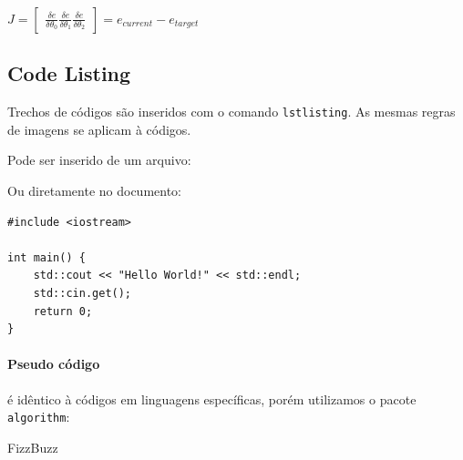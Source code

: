 \documentclass[10pt, a4paper]{article}
\begin{document}
    {\centering \Large \(
        J = \begin{bmatrix}
            \frac{\delta e}{\delta \theta _0}
            \frac{\delta e}{\delta \theta _1}
            \frac{\delta e}{\delta \theta _2}
        \end{bmatrix}
        = e_{current} - e_{target} 
    \)\par}
	
	\subsection{Code Listing}
    Trechos de códigos são inseridos com o comando \texttt{lstlisting}. As mesmas regras de imagens se aplicam à códigos.

    Pode ser inserido de um arquivo:

    

    Ou diretamente no documento:
    
\begin{lstlisting}[caption = Hello World! in c++]
#include <iostream>

int main() {
    std::cout << "Hello World!" << std::endl;
    std::cin.get();
    return 0;
}
\end{lstlisting}
    
\paragraph{Pseudo código} é idêntico à códigos em linguagens específicas, porém utilizamos o pacote \texttt{algorithm}:

\begin{algorithm}[!htb]
\caption{FizzBuzz}
\end{algorithm}
	


		
\end{document}
